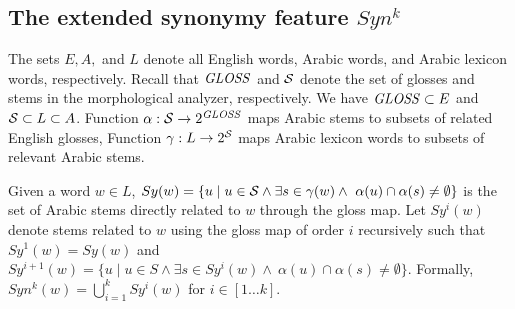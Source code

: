 

\subsection{The extended synonymy feature $Syn^k$}
\label{subsec:synk} 

The sets $E, A,$ and $L$ denote all English words, Arabic words, 
and Arabic lexicon words, respectively.
Recall that $\mathit{GLOSS}$ and $\ss$ denote the set of glosses and stems in the morphological analyzer, respectively.
We have $\mathit{GLOSS} \subset E$ and $\ss \subset L \subset A$. 
Function $\alpha: \ss \rightarrow 2^{\GG}$ maps Arabic stems to 
subsets of related English glosses, %
Function $\gamma: L \rightarrow 2^{\ss}$ maps Arabic lexicon words to subsets 
of relevant Arabic stems. %

Given a word $w\in L$, 
$Sy(w)=\{u\mid u\in \ss \land\exists s\in \gamma(w)\land~\alpha(u)\cap\alpha(s)\neq\emptyset\}$
is the set of Arabic stems 
directly related to $w$ through the gloss map.
%
Let $Sy^{i}(w)$ denote stems related to $w$ using the gloss map of order $i$ recursively such that
$Sy^{1}(w) = Sy(w)$ and
$Sy^{i+1}(w)=\{u\mid u\in S\land\exists s\in Sy^{i}(w)\land~\alpha(u)\cap\alpha(s)\neq\emptyset\}$.
Formally, $Syn^k(w) = \bigcup\limits_{i=1}^{k} Sy^{i}(w)$ for $i\in[1 \ldots k]$.
%

